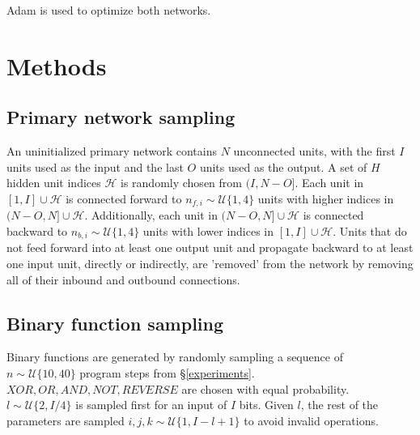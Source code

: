 \documentclass{article}[12px]
\begin{document}
Adam \cite{DBLP:journals/corr/KingmaB14} is used to optimize both networks.

{}


\pagebreak

\appendix
\section{Methods}

\subsection{Primary network sampling}

An uninitialized primary network contains \(N\) unconnected units, with the first \(I\) units used as the input and the last \(O\) units used as the output. A set of \(H\) hidden unit indices \(\mathcal{H}\) is randomly chosen from \((I, N - O]\). Each unit in \([1, I] \cup \mathcal{H}\) is connected forward to \(n_{f, i} \sim \mathcal{U}\{1, 4\}\) units with higher indices in \((N - O, N] \cup \mathcal{H}\). Additionally, each unit in \((N - O, N] \cup \mathcal{H}\) is connected backward to \(n_{b,i} \sim \mathcal{U}\{1, 4\}\) units with lower indices in \([1, I] \cup \mathcal{H}\). Units that do not feed forward into at least one output unit and propagate backward to at least one input unit, directly or indirectly, are 'removed' from the network by removing all of their inbound and outbound connections.

\subsection{Binary function sampling}

Binary functions are generated by randomly sampling a sequence of \(n \sim \mathcal{U}\{10, 40\}\) program steps from \S \ref{experiments}. \(XOR, OR, AND, NOT, REVERSE\) are chosen with equal probability. \(l \sim \mathcal{U}\{2, {I/4}\}\) is sampled first for an input of \(I\) bits. Given \(l\), the rest of the parameters are sampled \(i, j, k \sim \mathcal{U}\{1, I-l+1\}\) to avoid invalid operations.
\end{document}
